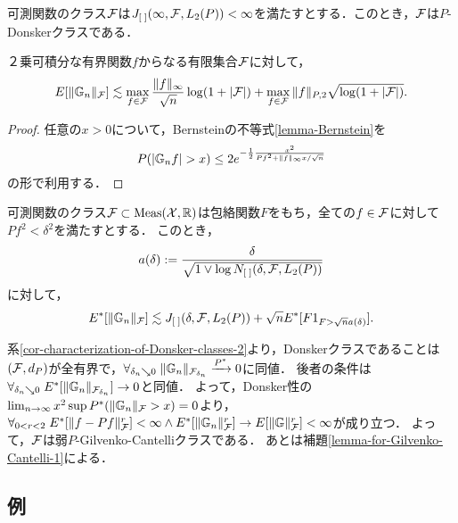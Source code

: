 \documentclass[uplatex,dvipdfmx]{jsreport}
\begin{document}
\begin{theorem}\label{thm-Donsker-2}
    可測関数のクラス$\mathcal{F}$は$J_{[\;]}(\infty,\mathcal{F},L_2(P))<\infty$を満たすとする．このとき，$\mathcal{F}$は$P$-Donskerクラスである．
\end{theorem}

\begin{lemma}
    ２乗可積分な有界関数$f$からなる有限集合$\mathcal{F}$に対して，
    \[E[\|\mathbb{G}_n\|_{\mathcal{F}}]\lesssim\max_{f\in\mathcal{F}}\frac{\|f\|_\infty}{\sqrt{n}}\log(1+\lvert\mathcal{F}\rvert)+\max_{f\in\mathcal{F}}\|f\|_{P,2}\sqrt{\log(1+\lvert\mathcal{F}\rvert)}.\]
\end{lemma}
\begin{proof}
    任意の$x>0$について，Bernsteinの不等式\ref{lemma-Bernstein}を
    \[P(\lvert\mathbb{G}_nf\rvert>x)\le 2e^{-\frac{1}{2}\frac{x^2}{Pf^2+\|f\|_\infty x/\sqrt{n}}}\]
    の形で利用する．
\end{proof}

\begin{lemma}
    可測関数のクラス$\mathcal{F}\subset\mathrm{Meas}(\mathcal{X},\mathbb{R})$は包絡関数$F$をもち，全ての$f\in\mathcal{F}$に対して$Pf^2<\delta^2$を満たすとする．
    このとき，
    \[a(\delta):=\frac{\delta}{\sqrt{1\lor\log N_{[\;]}(\delta,\mathcal{F},L_2(P))}}\]
    に対して，
    \[E^*[\|\mathbb{G}_n\|_{\mathcal{F}}]\lesssim J_{[\;]}(\delta,\mathcal{F},L_2(P))+\sqrt{n}E^*[F1_{F>\sqrt{n}a(\delta)}].\]
\end{lemma}

\begin{remark}
    系\ref{cor-characterization-of-Donsker-classes-2}より，Donskerクラスであることは$(\mathcal{F},d_P)$が全有界で，$\forall_{\delta_n\searrow0}\;\|\mathbb{G}_n\|_{\mathcal{F}_{\delta_n}}\xrightarrow{P^*}0$に同値．
    後者の条件は$\forall_{\delta_n\searrow0}\;E^*[\|\mathbb{G}_n\|_{\mathcal{F}_{\delta_n}}]\to0$と同値．
    よって，Donsker性の$\lim_{n\to\infty}x^2\sup P^*(\|\mathbb{G}_n\|_{\mathcal{F}}>x)=0$より，$\forall_{0<r<2}\;E^*[\|f-Pf\|^r_{\mathcal{F}}]<\infty\land E^*[\|\mathbb{G}_n\|^r_{\mathcal{F}}]\to E[\|\mathbb{G}\|^r_{\mathcal{F}}]<\infty$が成り立つ．
    よって，$\mathcal{F}$は弱$P$-Gilvenko-Cantelliクラスである．
    あとは補題\ref{lemma-for-Gilvenko-Cantelli-1}による．
\end{remark}

\subsection{例}
\end{document}
